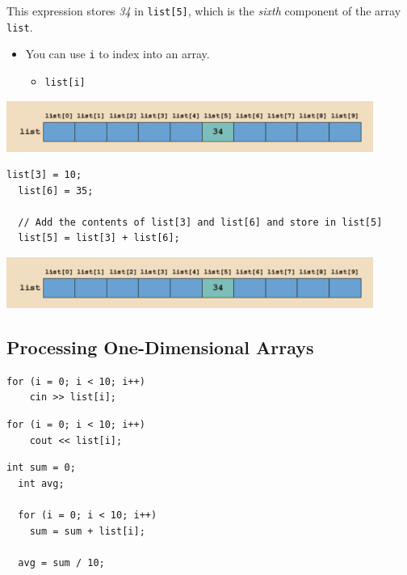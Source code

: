 \documentclass{article}
\begin{document}
This expression stores \textit{34} in \texttt{list[5]}, which is the
\textit{sixth} component of the array \texttt{list}.

\begin{itemize}
  \item You can use \texttt{i} to index into an array.
  \begin {itemize}
    \item \texttt{list[i]}
  \end{itemize}
\end{itemize}

\begin{center}
    \includegraphics[width=0.9\textwidth]{1d-arr-var-assign.png}
\end{center}

\begin{lstlisting}[caption={1D Array Assignment Cont}]
  list[3] = 10;
  list[6] = 35;

  // Add the contents of list[3] and list[6] and store in list[5]
  list[5] = list[3] + list[6];
\end{lstlisting}

\begin{center}
    \includegraphics[width=0.9\textwidth]{1d-arr-var-assign.png}
\end{center}

\subsection{Processing One-Dimensional Arrays}

\begin{lstlisting}[caption={Read Data Into 1D Array}]
  for (i = 0; i < 10; i++)
    cin >> list[i];
\end{lstlisting}

\begin{lstlisting}[caption={Print Data From 1D Array}]
  for (i = 0; i < 10; i++)
    cout << list[i];
\end{lstlisting}

\begin{lstlisting}[caption={Find Sum \& Avg From 1D Array}]
  int sum = 0;
  int avg;

  for (i = 0; i < 10; i++)
    sum = sum + list[i]; 

  avg = sum / 10;
\end{lstlisting}
\end{document}
